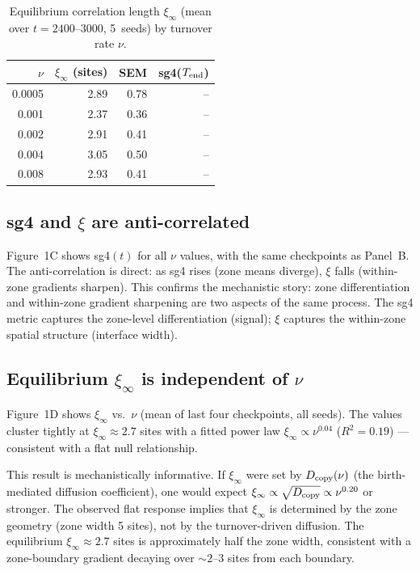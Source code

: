 \documentclass[11pt]{article}
\begin{document}
\begin{table}[ht]
\centering
\caption{Equilibrium correlation length $\xi_\infty$ (mean over $t=2400$--$3000$,
5~seeds) by turnover rate $\nu$.}
\label{tab:xi}
\begin{tabular}{rrrr}
\toprule
$\nu$ & $\xi_\infty$ (sites) & SEM & sg4($T_{\rm end}$) \\
\midrule
0.0005 & 2.89 & 0.78 & -- \\
0.001  & 2.37 & 0.36 & -- \\
0.002  & 2.91 & 0.41 & -- \\
0.004  & 3.05 & 0.50 & -- \\
0.008  & 2.93 & 0.41 & -- \\
\bottomrule
\end{tabular}
\end{table}

\subsection{sg4 and $\xi$ are anti-correlated}

Figure~1C shows sg4$(t)$ for all $\nu$ values, with the same checkpoints as Panel~B.
The anti-correlation is direct: as sg4 rises (zone means diverge), $\xi$ falls (within-zone
gradients sharpen).
This confirms the mechanistic story: zone differentiation and within-zone gradient sharpening
are two aspects of the same process.
The sg4 metric captures the zone-level differentiation (signal); $\xi$ captures the
within-zone spatial structure (interface width).

\subsection{Equilibrium $\xi_\infty$ is independent of $\nu$}

Figure~1D shows $\xi_\infty$ vs.\ $\nu$ (mean of last four checkpoints, all seeds).
The values cluster tightly at $\xi_\infty \approx 2.7$ sites with a fitted power law
$\xi_\infty \propto \nu^{0.04}$ ($R^2 = 0.19$) --- consistent with a flat null relationship.

This result is mechanistically informative.
If $\xi_\infty$ were set by $D_{\rm copy}(\nu)$ (the birth-mediated diffusion coefficient),
one would expect $\xi_\infty \propto \sqrt{D_{\rm copy}} \propto \nu^{0.20}$ or stronger.
The observed flat response implies that $\xi_\infty$ is determined by the zone geometry
(zone width 5 sites), not by the turnover-driven diffusion.
The equilibrium $\xi_\infty \approx 2.7$ sites is approximately half the zone width,
consistent with a zone-boundary gradient decaying over ${\sim}2$--$3$ sites from each boundary.
\end{document}
